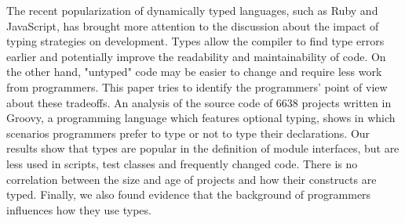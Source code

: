 The recent popularization of dynamically typed languages, such as Ruby and JavaScript, has brought more attention to the discussion about the impact of typing strategies on development.
Types allow the compiler to find type errors earlier and potentially improve the readability and maintainability of code.
On the other hand, "untyped" code may be easier to change and require less work from programmers.
This paper tries to identify the programmers' point of view about these tradeoffs.
An analysis of the source code of 6638 projects written in Groovy, a programming language which features optional typing, shows in which scenarios programmers prefer to type or not to type their declarations. 
Our results show that types are popular in the definition of module interfaces, but are less used in scripts, test classes and frequently changed code.
There is no correlation between the size and age of projects and how their constructs are typed.
Finally, we also found evidence that the background of programmers influences how they use types.

